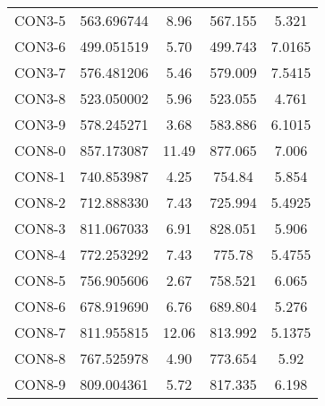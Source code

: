 \begin{table}[ht]
\begin{tabular}{c c c c c}
CON3-5 & 563.696744 & 8.96 & 567.155 & 5.321 \\
CON3-6 & 499.051519 & 5.70 & 499.743 & 7.0165 \\
CON3-7 & 576.481206 & 5.46 & 579.009 & 7.5415 \\
CON3-8 & 523.050002 & 5.96 & 523.055 & 4.761 \\
CON3-9 & 578.245271 & 3.68 & 583.886 & 6.1015 \\
CON8-0 & 857.173087 & 11.49 & 877.065 & 7.006 \\
CON8-1 & 740.853987 & 4.25 & 754.84 & 5.854 \\
CON8-2 & 712.888330 & 7.43 & 725.994 & 5.4925 \\
CON8-3 & 811.067033 & 6.91 & 828.051 & 5.906 \\
CON8-4 & 772.253292 & 7.43 & 775.78 & 5.4755 \\
CON8-5 & 756.905606 & 2.67 & 758.521 & 6.065 \\
CON8-6 & 678.919690 & 6.76 & 689.804 & 5.276 \\
CON8-7 & 811.955815 & 12.06 & 813.992 & 5.1375 \\
CON8-8 & 767.525978 & 4.90 & 773.654 & 5.92 \\
CON8-9 & 809.004361 & 5.72 & 817.335 & 6.198 \\
[1ex]\hline
\end{tabular}
\label{table:nonlin}
\end{table} \clearpage
